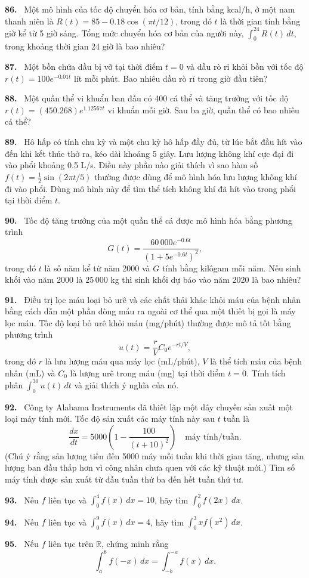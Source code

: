 \documentclass[12pt,a4paper]{article}
\newcommand{\bt}[1]{\par\smallskip\Needspace{5\baselineskip}\noindent\textbf{#1.}\ }
\begin{document}
\bt{86} Một mô hình của tốc độ chuyển hóa cơ bản, tính bằng kcal/h, ở một nam thanh niên là $R(t)=85-0.18\cos(\pi t/12)$, trong đó $t$ là thời gian tính bằng giờ kể từ 5 giờ sáng. Tổng mức chuyển hóa cơ bản của người này, $\int_0^{24}R(t)\,dt$, trong khoảng thời gian 24 giờ là bao nhiêu?
\bt{87} Một bồn chứa dầu bị vỡ tại thời điểm $t=0$ và dầu rò rỉ khỏi bồn với tốc độ $r(t)=100e^{-0.01t}$ lít mỗi phút. Bao nhiêu dầu rò rỉ trong giờ đầu tiên?
\bt{88} Một quần thể vi khuẩn ban đầu có 400 cá thể và tăng trưởng với tốc độ $r(t)=(450.268)e^{1.12567t}$ vi khuẩn mỗi giờ. Sau ba giờ, quần thể có bao nhiêu cá thể?
\bt{89} Hô hấp có tính chu kỳ và một chu kỳ hô hấp đầy đủ, từ lúc bắt đầu hít vào đến khi kết thúc thở ra, kéo dài khoảng 5 giây. Lưu lượng không khí cực đại đi vào phổi khoảng 0.5 L/s. Điều này phần nào giải thích vì sao hàm số $f(t)=\frac12\sin(2\pi t/5)$ thường được dùng để mô hình hóa lưu lượng không khí đi vào phổi. Dùng mô hình này để tìm thể tích không khí đã hít vào trong phổi tại thời điểm $t$.
\bt{90} Tốc độ tăng trưởng của một quần thể cá được mô hình hóa bằng phương trình
\[G(t)=\frac{60\,000e^{-0.6t}}{(1+5e^{-0.6t})^2},\]
trong đó $t$ là số năm kể từ năm 2000 và $G$ tính bằng kilôgam mỗi năm. Nếu sinh khối vào năm 2000 là $25\,000$ kg thì sinh khối dự báo vào năm 2020 là bao nhiêu?
\bt{91} Điều trị lọc máu loại bỏ urê và các chất thải khác khỏi máu của bệnh nhân bằng cách dẫn một phần dòng máu ra ngoài cơ thể qua một thiết bị gọi là máy lọc máu. Tốc độ loại bỏ urê khỏi máu (mg/phút) thường được mô tả tốt bằng phương trình
\[u(t)=\frac rV C_0e^{-rt/V},\]
trong đó $r$ là lưu lượng máu qua máy lọc (mL/phút), $V$ là thể tích máu của bệnh nhân (mL) và $C_0$ là lượng urê trong máu (mg) tại thời điểm $t=0$. Tính tích phân $\int_0^{30}u(t)\,dt$ và giải thích ý nghĩa của nó.
\bt{92} Công ty Alabama Instruments đã thiết lập một dây chuyền sản xuất một loại máy tính mới. Tốc độ sản xuất các máy tính này sau $t$ tuần là
\[\frac{dx}{dt}=5000\left(1-\frac{100}{(t+10)^2}\right)\quad\text{máy tính/tuần}.\]
(Chú ý rằng sản lượng tiến đến 5000 máy mỗi tuần khi thời gian tăng, nhưng sản lượng ban đầu thấp hơn vì công nhân chưa quen với các kỹ thuật mới.) Tìm số máy tính được sản xuất từ đầu tuần thứ ba đến hết tuần thứ tư.
\bt{93} Nếu $f$ liên tục và $\int_0^4f(x)\,dx=10$, hãy tìm $\int_0^2f(2x)\,dx$.
\bt{94} Nếu $f$ liên tục và $\int_0^9f(x)\,dx=4$, hãy tìm $\int_0^3xf(x^2)\,dx$.
\bt{95} Nếu $f$ liên tục trên $\mathbb R$, chứng minh rằng
\[\int_a^bf(-x)\,dx=\int_{-b}^{-a}f(x)\,dx.\]
\end{document}
